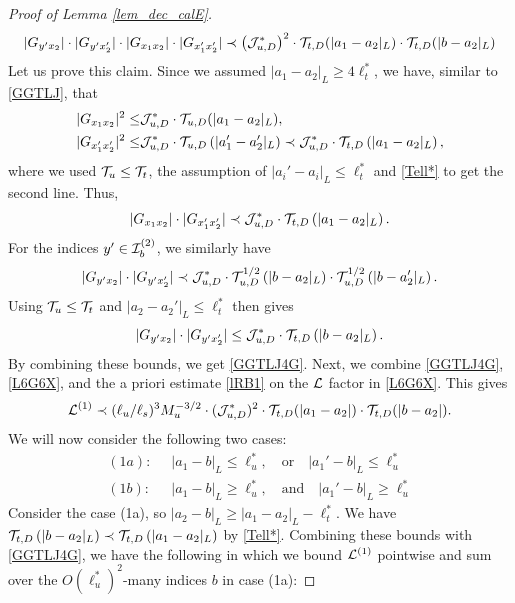 \begin{proof}[Proof of Lemma \ref{lem_dec_calE}]
\begin{align}
|G_{y'x_2}|\cdot |G_{y'x_2'}| 
\cdot 
|G_{x_1x_2}|\cdot |G_{x_1'x_2'}|
\prec 
\left({\cal J}^*_{u,D}\right)^2\cdot 
{\cal T} _{t,D}(|a_1-a_2|_{L})\cdot {\cal T} _{t,D}( |b-a_2|_{L})    
\end{align}
Let us prove this claim. Since we assumed $|a_1-a_2|_{L}\ge 4\ell_t^*$, we have, similar to \eqref{GGTLJ}, that 
\begin{align} 
 |G_{x_1x_2}|^2\le  & {\cal J}^*_{u,D}\cdot {\cal T}_{u,D}(|a_1-a_2|_{L}), \\
 |G_{x_1'x_2'}|^2\le & {\cal J}^*_{u,D}\cdot {\cal T}_{u,D}\left( |a_1'-a_2'|_{L}\right)  \prec {\cal J}^*_{u,D}\cdot {\cal T}_{t,D}\left( |a_1-a_2|_{L}\right), 
\end{align} 
where  we used ${\cal T}_u\le {\cal T}_t$, the assumption of $|a_i'-a_i|_{L}\le \ell_t^*$ and \eqref{Tell*} to get the second line.  Thus, 
$$
|G_{x_1x_2}|\cdot |G_{x_1'x_2'}|\prec   {\cal J}^*_{u,D}\cdot {\cal T}_{t,D}\left( |a_1-a_2|_{L}\right).
$$ 
For the indices $y'\in{\cal I}^{(2)}_{b}$, we similarly have
$$
|G_{y'x_2}|\cdot |G_{y'x_2'}| \prec 
{\cal J}^*_{u,D}\cdot  {\cal T}^{1/2}_{u,D}\left( |b-a_2|_{L} \right)\cdot   {\cal T}^{1/2}_{u,D}\left(  |b-a_2'|_{L} \right).
$$
Using  ${\cal T}_u\le {\cal T}_t$ and $|a_2-a_2'|_{L}\le \ell_t^*$ then gives 
$$
|G_{y'x_2}|\cdot |G_{y'x_2'}|\le {\cal J}^*_{u,D}\cdot  {\cal T} _{t,D}\left(  |b-a_2|_{L} \right).
$$
By combining  these  bounds, we get \eqref{GGTLJ4G}. Next, we combine \eqref{GGTLJ4G}, \eqref{L6G6X}, and the a priori estimate \eqref{lRB1} on the ${\cal L}$ factor in \eqref{L6G6X}. This gives
%
\begin{align*}
{\cal L}^{(1)}\prec (\ell_{u}/\ell_{s})^{3}M_{u}^{-3/2}\cdot({\cal J}^{\ast}_{u,D})^{2}\cdot{\cal T}_{t,D}(|a_{1}-a_{2}|)\cdot{\cal T}_{t,D}(|b-a_{2}|).
\end{align*}
%
We will now consider the following two cases:
\begin{align}
(1a): \;&\; |a_1-b|_{L}\le \ell_u^*,\quad \text{or}\quad |a_1'-b|_{L}\le \ell_u^*\nonumber \\
(1b):   \;&\;  |a_1-b|_{L}\ge \ell_u^*,\quad \text{and}\quad |a_1'-b|_{L}\ge \ell_u^*
\end{align} 
Consider the case (1a), so  $|a_2-b|_{L}\ge |a_1-a_2|_{L}-\ell_t^*$. We have ${\cal T} _{t,D}\left(  |b-a_2|_{L} \right) \prec 
{\cal T} _{t,D}\left(  |a_1-a_2|_{L} \right)$ by \eqref{Tell*}. 
Combining  these bounds  with \eqref{GGTLJ4G}, we have the following in which we bound ${\cal L}^{(1)}$ pointwise and sum over the $O(\ell_{u}^{\ast})^{2}$-many indices $b$ in case (1a):

\end{proof}
